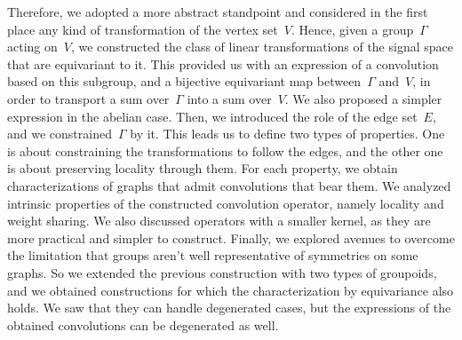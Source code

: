 Therefore, we adopted a more abstract standpoint and considered in the first place any kind of transformation of the vertex set~$V$. Hence, given a group~$\Gamma$ acting on~$V$, we constructed the class of linear transformations of the signal space that are equivariant to it. This provided us with an expression of a convolution based on this subgroup, and a bijective equivariant map between~$\Gamma$ and~$V$, in order to transport a sum over~$\Gamma$ into a sum over~$V$. We also proposed a simpler expression in the abelian case.
Then, we introduced the role of the edge set~$E$, and we constrained~$\Gamma$ by it. This leads us to define two types of properties. One is about constraining the transformations to follow the edges, and the other one is about preserving locality through them. For each property, we obtain characterizations of graphs that admit convolutions that bear them. We analyzed intrinsic properties of the constructed convolution operator, namely locality and weight sharing. We also discussed operators with a smaller kernel, as they are more practical and simpler to construct.
Finally, we explored avenues to overcome the limitation that groups aren't well representative of symmetries on some graphs. So we extended the previous construction with two types of groupoids, and we obtained constructions for which the characterization by equivariance also holds. We saw that they can handle degenerated cases, but the expressions of the obtained convolutions can be degenerated as well.


